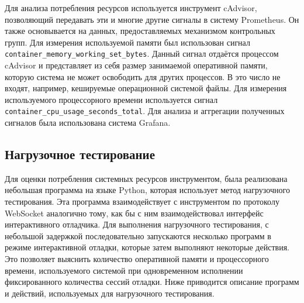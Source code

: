 \documentclass[a4paper,article,14pt]{extarticle}
\begin{document}
Для анализа потребления ресурсов используется инструмент cAdvisor\cite{cadvisor}, позволяющий передавать эти и многие другие сигналы в систему Prometheus. Он также основывается на данных, предоставляемых механизмом контрольных групп. Для измерения используемой памяти был использован сигнал \texttt{container\_memory\_working\_set\_bytes}. Данный сигнал отдаётся процессом cAdvisor и представляет из себя размер занимаемой оперативной памяти, которую система не может освободить для других процессов. В это число не входят, например, кешируемые операционной системой файлы. Для измерения используемого процессорного времени используется сигнал \texttt{container\_cpu\_usage\_seconds\_total}. Для анализа и аггрегации полученных сигналов была использована система Grafana\cite{grafana}.

\subsection{Нагрузочное тестирование}

Для оценки потребления системных ресурсов инструментом, была реализована небольшая программа на языке Python, которая использует метод нагрузочного тестирования. Эта программа взаимодействует с инструментом по протоколу WebSocket аналогично тому, как бы с ним взаимодействовал интерфейс интерактивного отладчика. Для выполнения нагрузочного тестирования, с небольшой задержкой последовательно запускаются несколько программ в режиме интерактивной отладки, которые затем выполняют некоторые действия. Это позволяет выяснить количество оперативной памяти и процессорного времени, используемого системой при одновременном исполнении фиксированного количества сессий отладки. Ниже приводится описание программ и действий, используемых для нагрузочного тестирования.
\end{document}
